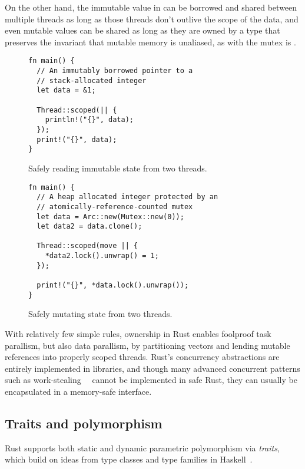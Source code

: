 On the other hand, the immutable value in  can be borrowed and shared between multiple threads as long as those threads don't outlive the scope of the data, and even mutable values can be shared as long
as they are owned by a type that preserves the invariant that mutable memory is unaliased, as with the
mutex is .

\begin{figure}
\begin{lstlisting}
fn main() {
  // An immutably borrowed pointer to a
  // stack-allocated integer
  let data = &1;

  Thread::scoped(|| {
    println!("{}", data);
  });
  print!("{}", data);
}
\end{lstlisting}
  \caption{Safely reading immutable state from two threads.}
  \label{fig:shared-concurrency}
\end{figure}

\begin{figure}
\begin{lstlisting}
fn main() {
  // A heap allocated integer protected by an
  // atomically-reference-counted mutex
  let data = Arc::new(Mutex::new(0));
  let data2 = data.clone();

  Thread::scoped(move || {
    *data2.lock().unwrap() = 1;
  });

  print!("{}", *data.lock().unwrap());
}
\end{lstlisting}
  \caption{Safely mutating state from two threads.}
  \label{fig:shared-mutable-concurrency}
\end{figure}

With relatively few simple rules, ownership in Rust enables foolproof task parallism,
but also data parallism, by partitioning vectors and lending mutable references into properly scoped threads.
Rust's concurrency abstractions are entirely implemented in libraries, and though
many advanced concurrent patterns such as work-stealing~~\cite{blumeofe:multiprogrammed-work-stealing}
cannot be implemented in safe Rust, they can usually be encapsulated in a memory-safe interface.

\subsection{Traits and polymorphism}

Rust supports both static and dynamic parametric polymorphism via \emph{traits},
which build on ideas from type classes and type families in Haskell~\cite{haskell}.

